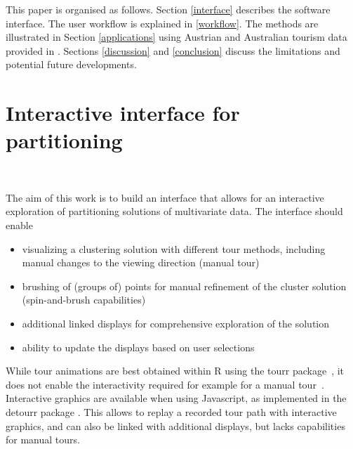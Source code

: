 \documentclass[article]{ajs}
\begin{document}

This paper is organised as follows. Section \ref{interface} describes the software interface. The user workflow is explained in \ref{workflow}.  The methods are illustrated in Section \ref{applications} using Austrian and Australian tourism data provided in \cite{leisch2018market}. Sections \ref{discussion} and \ref{conclusion} discuss the limitations and potential future developments.

\section{Interactive interface for partitioning}~\label{interface}

The aim of this work is to build an interface that allows for an interactive exploration of partitioning solutions of multivariate data. The interface should enable

\begin{itemize}
\item visualizing a clustering solution with different tour methods, including manual changes to the viewing direction (manual tour)
\item brushing of (groups of) points for manual refinement of the cluster solution (spin-and-brush capabilities)
\item additional linked displays for comprehensive exploration of the solution
\item ability to update the displays based on user selections
\end{itemize}

While tour animations are best obtained within R using the tourr package~\citep{tourr}, it does not enable the interactivity required for example for a manual tour~\citep{laa2023new}. Interactive graphics are available when using Javascript, as implemented in the detourr package \citep{RJ-2023-052}. This allows to replay a recorded tour path with interactive graphics, and can also be linked with additional displays, but lacks capabilities for manual tours.
\end{document}
